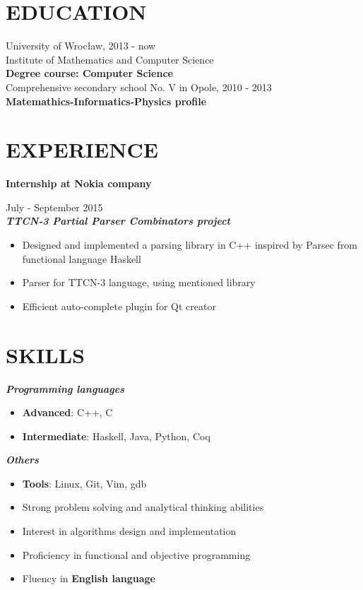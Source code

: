 \documentclass[line,overlapped]{res}
\newcommand{\textbt}[1]{\textit{\textbf{#1}}}
\begin{document}
\address{ Wrocław, przemek.lesniak1@gmail.com, \ tel.: 516 706 214}
 
\begin{resume} 
\section{EDUCATION}

University of Wrocław, 2013 - now \\
Institute of Mathematics and Computer Science \\
\textbf{Degree course: Computer Science} \\

Comprehensive secondary school No. V in Opole, 2010 - 2013 \\
\textbf{Matemathics-Informatics-Physics profile}

\section{EXPERIENCE}
\textbf{Internship at Nokia company} \raggedright July - September 2015 \\
\textbt{TTCN-3 Partial Parser Combinators project} 
\begin{itemize}
	\item{Designed and implemented a parsing library in C++ inspired by Parsec from functional language Haskell }
	\item{Parser for TTCN-3 language, using mentioned library }
	\item{Efficient auto-complete plugin for Qt creator } 
\end{itemize}

\section{SKILLS}

\textbt{Programming languages}
\begin{itemize}
	\item{\textbf{Advanced}: C++, C}
	\item{\textbf{Intermediate}: Haskell, Java, Python, Coq }
\end{itemize}
\textbt{Others}
\begin{itemize}
	\item{\textbf{Tools}: Linux, Git, Vim, gdb }
	\item{Strong problem solving and analytical thinking abilities }
	\item{Interest in algorithms design and implementation}
	\item{Proficiency in functional and objective programming }
	\item{Fluency in \textbf{English language} }
\end{itemize}


\end{resume}
\end{document}
